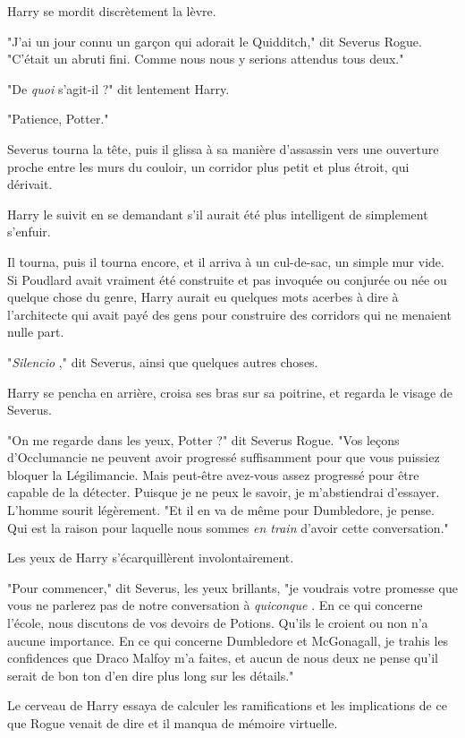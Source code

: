 Harry se mordit discrètement la lèvre.

"J'ai un jour connu un garçon qui adorait le Quidditch," dit Severus Rogue. "C'était un abruti fini. Comme nous nous y serions attendus tous deux."

"De \emph{quoi}  s'agit-il ?" dit lentement Harry.

"Patience, Potter."

Severus tourna la tête, puis il glissa à sa manière d'assassin vers une ouverture proche entre les murs du couloir, un corridor plus petit et plus étroit, qui dérivait.

Harry le suivit en se demandant s'il aurait été plus intelligent de simplement s'enfuir.

Il tourna, puis il tourna encore, et il arriva à un cul-de-sac, un simple mur vide. Si Poudlard avait vraiment été construite et pas invoquée ou conjurée ou née ou quelque chose du genre, Harry aurait eu quelques mots acerbes à dire à l'architecte qui avait payé des gens pour construire des corridors qui ne menaient nulle part.

"\emph{Silencio} ," dit Severus, ainsi que quelques autres choses.

Harry se pencha en arrière, croisa ses bras sur sa poitrine, et regarda le visage de Severus.

"On me regarde dans les yeux, Potter ?" dit Severus Rogue. "Vos leçons d'Occlumancie ne peuvent avoir progressé suffisamment pour que vous puissiez bloquer la Légilimancie. Mais peut-être avez-vous assez progressé pour être capable de la détecter. Puisque je ne peux le savoir, je m'abstiendrai d'essayer. L'homme sourit légèrement. "Et il en va de même pour Dumbledore, je pense. Qui est la raison pour laquelle nous sommes \emph{en train}  d'avoir cette conversation."

Les yeux de Harry s'écarquillèrent involontairement.

"Pour commencer," dit Severus, les yeux brillants, "je voudrais votre promesse que vous ne parlerez pas de notre conversation à \emph{quiconque} . En ce qui concerne l'école, nous discutons de vos devoirs de Potions. Qu'ils le croient ou non n'a aucune importance. En ce qui concerne Dumbledore et McGonagall, je trahis les confidences que Draco Malfoy m'a faites, et aucun de nous deux ne pense qu'il serait de bon ton d'en dire plus long sur les détails."

Le cerveau de Harry essaya de calculer les ramifications et les implications de ce que Rogue venait de dire et il manqua de mémoire virtuelle.

